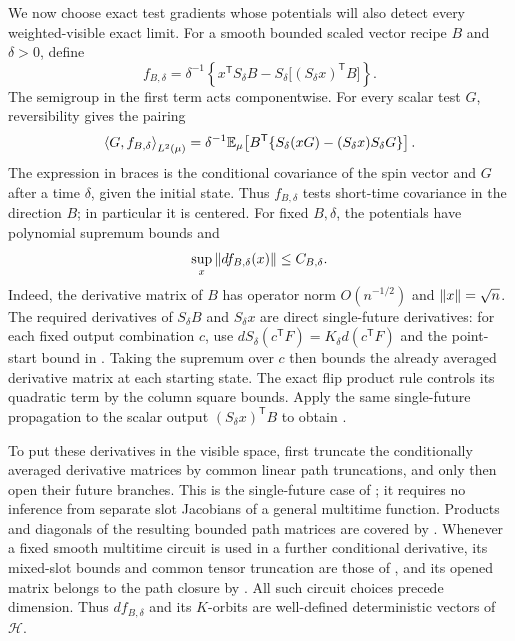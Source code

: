 We now choose exact test gradients whose potentials will also detect
every weighted-visible exact limit.  For a smooth bounded scaled vector
recipe $B$ and $\delta>0$, define
\begin{equation}\label{eq:exact-potential}
 f_{B,\delta}
 =\delta^{-1}\left\{x^{\mathsf T}S_\delta B
       -S_\delta\bigl[(S_\delta x)^{\mathsf T}B\bigr]\right\}.
\end{equation}
The semigroup in the first term acts componentwise.  For every scalar
test $G$, reversibility gives the pairing
\[
 \left\langle G,f_{B,\delta}\right\rangle_{L^2(\mu)}
 =\delta^{-1}\mathbb E_\mu\!\left[
 B^{\mathsf T}\{S_\delta(xG)-(S_\delta x)S_\delta G\}\right].
\]
The expression in braces is the conditional covariance of the spin
vector and $G$ after a time $\delta$, given the initial state.  Thus
$f_{B,\delta}$ tests short-time covariance in the direction $B$;
in particular it is centered.  For fixed $B,\delta$, the potentials have
polynomial supremum bounds and
\begin{equation}\label{eq:exact-test-bound}
 \sup_x\left\lVert df_{B,\delta}(x)\right\rVert\le C_{B,\delta}.
\end{equation}
Indeed, the derivative matrix of $B$ has operator norm $O(n^{-1/2})$
and $\left\lVert x\right\rVert=\sqrt n$.  The required derivatives of $S_\delta B$ and
$S_\delta x$ are direct single-future derivatives: for each fixed output
combination $c$, use $dS_\delta(c^{\mathsf T}F)
=K_\delta d(c^{\mathsf T}F)$ and the point-start bound in
.  Taking the supremum over $c$ then bounds the
already averaged derivative matrix at each starting state.  The exact
flip product rule controls its quadratic term by the column square
bounds.  Apply the same single-future propagation to the scalar output
$(S_\delta x)^{\mathsf T}B$ to obtain .

To put these derivatives in the visible space, first truncate the
conditionally averaged derivative matrices by common linear path
truncations, and only then open their future branches.  This is the single-future case of
; it requires no inference from
separate slot Jacobians of a general multitime function.  Products and
diagonals of the resulting bounded path matrices are covered by
.  Whenever a fixed smooth multitime circuit is
used in a further conditional derivative, its mixed-slot bounds and
common tensor truncation are those of
, and its
opened matrix belongs to the path closure by
.  All such circuit choices precede
dimension.  Thus $df_{B,\delta}$ and its $K$-orbits are well-defined
deterministic vectors of $\mathcal H$.

